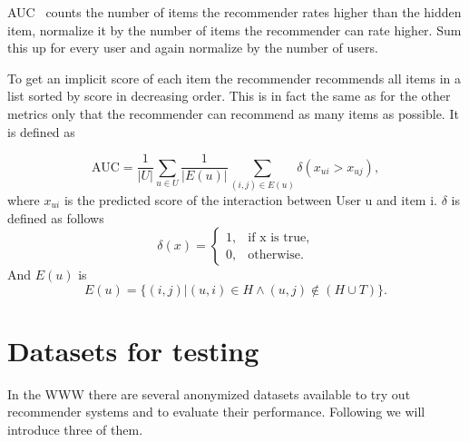 AUC~\cite{Rendle:2009:BBP:1795114.1795167} counts the number of items the recommender rates
higher than the hidden item, normalize it by the number of items the
recommender can rate higher. Sum this up for every user and again
normalize by the number of users.

To get an implicit score of each item the recommender recommends all
items in a list sorted by score in decreasing order. This is in fact the same
as for the other metrics only that the recommender can recommend as
many items as possible. It is defined as

\begin{equation}
\text{AUC}=\frac{1}{|U|}\sum_{u \in U} \frac{1}{|E(u)|} \sum_{(i,j) \in E(u)} \delta(x_{ui}>x_{uj}),
\end{equation}
where \(x_{ui}\) is the predicted score of the interaction between User u and item i.
\(\delta\) is defined as follows
\begin{equation}
\delta(x)=\begin{cases}1, & \text{if x is true}, \\
                       0, & \text{otherwise}.
\end{cases}
\end{equation}
And \(E(u)\) is 
\begin{equation}
E(u) =\{(i,j)|(u,i) \in H \land (u,j) \not\in (H \cup T)\}.
\end{equation}


\section{Datasets for testing}

In the WWW there are several anonymized datasets available to try
out recommender systems and to evaluate their performance. 
Following we will introduce three of them.





